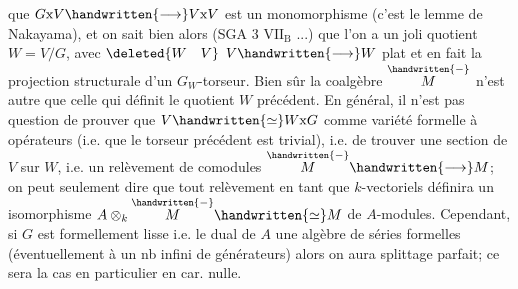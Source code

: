 que $G\mathrm{x}V\handwritten{\longrightarrow}V\mathrm{x}V$ est un monomorphisme (c'est le lemme de Nakayama), et on sait bien alors (SGA 3 $\mathrm{VII}_{\mathrm{B}}$ ...) que  l'on a un joli quotient $W=V/G$, avec $\deleted{W\quad V}$ $V\handwritten{\longrightarrow}W$ plat et en fait la projection structurale d'un $G_{W}$-torseur. Bien sûr la coalgèbre $\overset{\handwritten{-}}{M}$ n'est autre que celle qui définit le quotient $W$ précédent. En général, il n'est pas question de prouver que $V\handwritten{\simeq}W\mathrm{x}G$ comme variété formelle à opérateurs (i.e. que le torseur précédent est trivial), i.e. de trouver une section de $V$ sur $W$, i.e. un relèvement de comodules $\overset{\handwritten{-}}{M}\handwritten{\longrightarrow}M$; on peut seulement dire que tout relèvement en tant que $k$-vectoriels définira un isomorphisme $A\otimes_{k}\overset{\handwritten{-}}{M}\handwritten{\simeq}M$ de $A$-modules. Cependant, si $G$ est formellement lisse i.e. le dual de $A$ une algèbre de séries formelles (éventuellement à un nb infini de générateurs) alors on aura splittage parfait; ce sera la cas en particulier en car. nulle.


